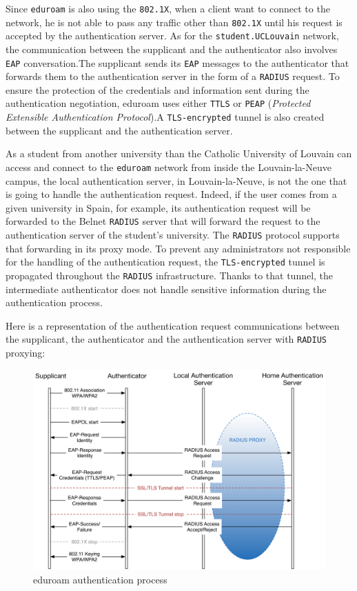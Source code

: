 Since \texttt{eduroam} is also using the \texttt{802.1X}, when a client want to connect to the network, he is not able to pass any traffic other than \texttt{802.1X} until his request is accepted by the authentication server. As for the \texttt{student.UCLouvain} network, the communication between the supplicant and the authenticator also involves \texttt{EAP} conversation.The supplicant sends its \texttt{EAP} messages to the authenticator that forwards them to the authentication server in the form of a \texttt{RADIUS} request. To ensure the protection of the credentials and information sent during the authentication negotiation, eduroam uses either \texttt{TTLS} or \texttt{PEAP} (\textit{Protected Extensible Authentication Protocol}).A \texttt{TLS-encrypted} tunnel is also created between the supplicant and the authentication server.

As a student from another university than the Catholic University of Louvain can access and connect to the \texttt{eduroam} network from inside the Louvain-la-Neuve campus, the local authentication server, in Louvain-la-Neuve, is not the one that is going to handle the authentication request. Indeed, if the user comes from a given university in Spain, for example, its authentication request will be forwarded to the Belnet \texttt{RADIUS} server that will forward the request to the authentication server of the student's university. The \texttt{RADIUS} protocol supports that forwarding in its proxy mode. To prevent any administrators not responsible for the handling of the authentication request, the \texttt{TLS-encrypted} tunnel is propagated throughout the \texttt{RADIUS} infrastructure. Thanks to that tunnel, the intermediate authenticator does not handle sensitive information during the authentication process.

Here is a representation of the authentication request communications between the supplicant, the authenticator and the authentication server with \texttt{RADIUS} proxying:
\begin{figure}[H]
	\includegraphics[width=1\linewidth]{Pictures/Chapter2/eduroam1.png}
	\caption{eduroam authentication process}
\end{figure}


